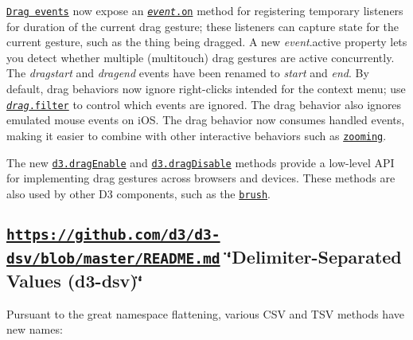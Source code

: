\href{https://github.com/d3/d3-drag/blob/master/README.md#drag-events}{\tt Drag events} now expose an \href{https://github.com/d3/d3-drag/blob/master/README.md#event_on}{\tt {\itshape event}.on} method for registering temporary listeners for duration of the current drag gesture; these listeners can capture state for the current gesture, such as the thing being dragged. A new {\itshape event}.active property lets you detect whether multiple (multitouch) drag gestures are active concurrently. The {\itshape dragstart} and {\itshape dragend} events have been renamed to {\itshape start} and {\itshape end}. By default, drag behaviors now ignore right-\/clicks intended for the context menu; use \href{https://github.com/d3/d3-drag/blob/master/README.md#drag_filter}{\tt {\itshape drag}.filter} to control which events are ignored. The drag behavior also ignores emulated mouse events on i\+OS. The drag behavior now consumes handled events, making it easier to combine with other interactive behaviors such as \href{#zooming-d3-zoom}{\tt zooming}.

The new \href{https://github.com/d3/d3-drag/blob/master/README.md#dragEnable}{\tt d3.\+drag\+Enable} and \href{https://github.com/d3/d3-drag/blob/master/README.md#dragDisable}{\tt d3.\+drag\+Disable} methods provide a low-\/level A\+PI for implementing drag gestures across browsers and devices. These methods are also used by other D3 components, such as the \href{#brushes-d3-brush}{\tt brush}.

\subsection*{\href{https://github.com/d3/d3-dsv/blob/master/README.md}{\tt https\+://github.\+com/d3/d3-\/dsv/blob/master/\+R\+E\+A\+D\+M\+E.\+md} \char`\"{}\+Delimiter-\/\+Separated Values (d3-\/dsv)\char`\"{}}

Pursuant to the great namespace flattening, various C\+SV and T\+SV methods have new names\+:



